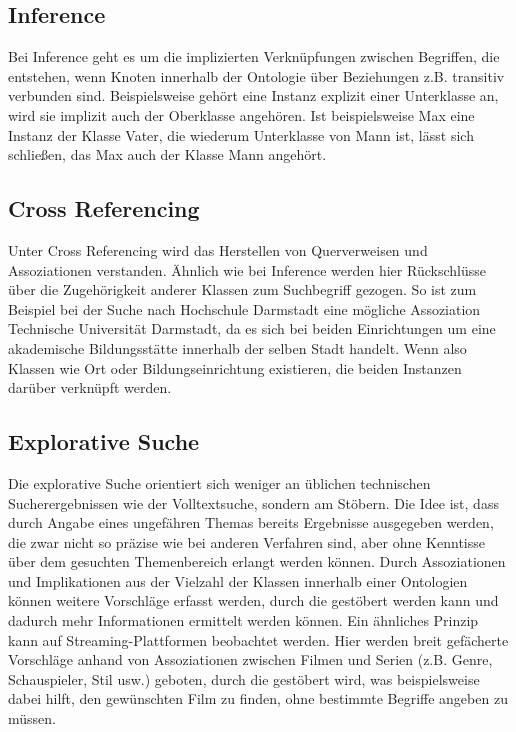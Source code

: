 \subsection*{Inference}
Bei Inference geht es um die implizierten Verknüpfungen zwischen Begriffen, die entstehen, wenn Knoten innerhalb der Ontologie über Beziehungen z.B. transitiv verbunden sind. Beispielsweise gehört eine Instanz explizit einer Unterklasse an, wird sie implizit auch der Oberklasse angehören. Ist beispielsweise \glqq Max\grqq{} eine Instanz der Klasse \glqq Vater\grqq{}, die wiederum Unterklasse von \glqq Mann\grqq{} ist, lässt sich schließen, das \glqq Max\grqq{} auch der Klasse \glqq Mann\grqq{} angehört.

\subsection*{Cross Referencing}
Unter Cross Referencing wird das Herstellen von Querverweisen und Assoziationen verstanden. Ähnlich wie bei Inference werden hier Rückschlüsse über die Zugehörigkeit anderer Klassen zum Suchbegriff gezogen. So ist zum Beispiel bei der Suche nach \glqq Hochschule Darmstadt\grqq{} eine mögliche Assoziation \glqq Technische Universität Darmstadt\grqq{}, da es sich bei beiden Einrichtungen um eine akademische Bildungsstätte innerhalb der selben Stadt handelt. Wenn also Klassen wie \glqq Ort\grqq{} oder \glqq Bildungseinrichtung\grqq{} existieren, die beiden Instanzen darüber verknüpft werden.

\subsection*{Explorative Suche}
Die explorative Suche orientiert sich weniger an üblichen technischen Sucherergebnissen wie der Volltextsuche, sondern am \glqq Stöbern\grqq{}. Die Idee ist, dass durch Angabe eines ungefähren Themas bereits Ergebnisse ausgegeben werden, die zwar nicht so präzise wie bei anderen Verfahren sind, aber ohne Kenntisse über dem gesuchten Themenbereich erlangt werden können. Durch Assoziationen und Implikationen aus der Vielzahl der Klassen innerhalb einer Ontologien können weitere Vorschläge erfasst werden, durch die \glqq gestöbert\grqq{} werden kann und dadurch mehr Informationen ermittelt werden können. Ein ähnliches Prinzip kann auf Streaming-Plattformen beobachtet werden. Hier werden breit gefächerte Vorschläge anhand von Assoziationen zwischen Filmen und Serien (z.B. Genre, Schauspieler, Stil usw.) geboten, durch die \glqq gestöbert\grqq{} wird, was beispielsweise dabei hilft, den gewünschten Film zu finden, ohne bestimmte Begriffe angeben zu müssen.
          
